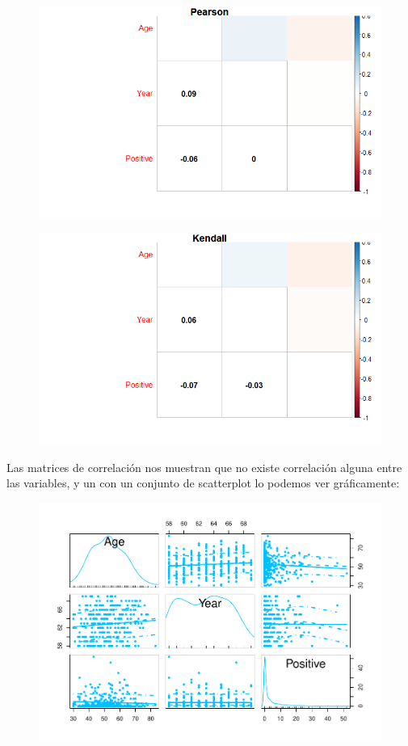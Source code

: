 \newpage

\begin{figure}[H]\includegraphics[width=\linewidth]{img/EDA2_files/corr1.png} \caption{}\end{figure}

\begin{figure}[H]\includegraphics[width=\linewidth]{img/EDA2_files/corr2.png} \caption{}\end{figure}

\newpage

Las matrices de correlación nos muestran que no existe correlación alguna entre las variables, y un con un conjunto de scatterplot lo podemos ver gráficamente:

\begin{figure}[H]\center\includegraphics[width=.88\linewidth]{img/EDA2_files/figure-latex/unnamed-chunk-28-1} \caption{}\end{figure}


